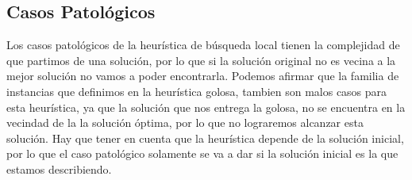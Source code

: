 \subsection{Casos Patológicos}

Los casos patológicos de la heurística de búsqueda local tienen la complejidad de que partimos de una solución, por lo que si la solución original no es vecina a la mejor solución no vamos a poder encontrarla. Podemos afirmar que la familia de instancias que definimos en la heurística golosa, tambien son malos casos para esta heurística, ya que la solución que nos entrega la golosa, no se encuentra en la vecindad de la la solución óptima, por lo que no lograremos alcanzar esta solución. Hay que tener en cuenta que la heurística depende de la solución inicial, por lo que el caso patológico solamente se va a dar si la solución inicial es la que estamos describiendo.